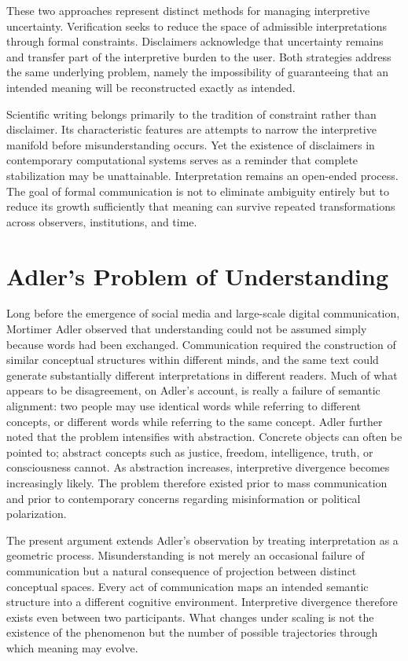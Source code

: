 \documentclass[11pt]{article}
\theoremstyle{plain}
\begin{document}
These two approaches represent distinct methods for managing interpretive uncertainty. Verification seeks to reduce the space of admissible interpretations through formal constraints. Disclaimers acknowledge that uncertainty remains and transfer part of the interpretive burden to the user. Both strategies address the same underlying problem, namely the impossibility of guaranteeing that an intended meaning will be reconstructed exactly as intended.

Scientific writing belongs primarily to the tradition of constraint rather than disclaimer. Its characteristic features are attempts to narrow the interpretive manifold before misunderstanding occurs. Yet the existence of disclaimers in contemporary computational systems serves as a reminder that complete stabilization may be unattainable. Interpretation remains an open-ended process. The goal of formal communication is not to eliminate ambiguity entirely but to reduce its growth sufficiently that meaning can survive repeated transformations across observers, institutions, and time.

\section{Adler's Problem of Understanding}

Long before the emergence of social media and large-scale digital communication, Mortimer Adler observed that understanding could not be assumed simply because words had been exchanged. Communication required the construction of similar conceptual structures within different minds, and the same text could generate substantially different interpretations in different readers. Much of what appears to be disagreement, on Adler's account, is really a failure of semantic alignment: two people may use identical words while referring to different concepts, or different words while referring to the same concept. Adler further noted that the problem intensifies with abstraction. Concrete objects can often be pointed to; abstract concepts such as justice, freedom, intelligence, truth, or consciousness cannot. As abstraction increases, interpretive divergence becomes increasingly likely. The problem therefore existed prior to mass communication and prior to contemporary concerns regarding misinformation or political polarization.

The present argument extends Adler's observation by treating interpretation as a geometric process. Misunderstanding is not merely an occasional failure of communication but a natural consequence of projection between distinct conceptual spaces. Every act of communication maps an intended semantic structure into a different cognitive environment. Interpretive divergence therefore exists even between two participants. What changes under scaling is not the existence of the phenomenon but the number of possible trajectories through which meaning may evolve.
\end{document}

